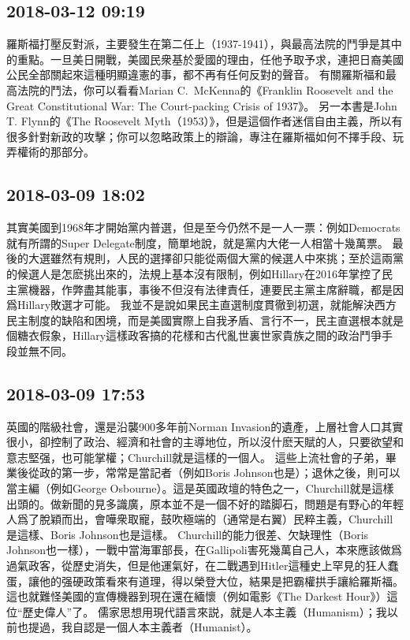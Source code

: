\documentclass[twocolumn]{ctexart}
\begin{document}
\subsection*{2018-03-12 09:19}

羅斯福打壓反對派，主要發生在第二任上（1937-1941），與最高法院的鬥爭是其中的重點。一旦美日開戰，美國民衆基於愛國的理由，任他予取予求，連把日裔美國公民全部關起來這種明顯違憲的事，都不再有任何反對的聲音。
有關羅斯福和最高法院的鬥法，你可以看看Marian C. McKenna的《Franklin Roosevelt and the Great Constitutional War: The Court-packing Crisis of 1937》。
另一本書是John T. Flynn的《The Roosevelt Myth（1953）》，但是這個作者迷信自由主義，所以有很多針對新政的攻擊；你可以忽略政策上的辯論，專注在羅斯福如何不擇手段、玩弄權術的那部分。
\subsection*{2018-03-09 18:02}

其實美國到1968年才開始黨内普選，但是至今仍然不是一人一票：例如Democrats就有所謂的Super Delegate制度，簡單地說，就是黨内大佬一人相當十幾萬票。
最後的大選雖然有規則，人民的選擇卻只能從兩個大黨的候選人中來挑；至於這兩黨的候選人是怎麽挑出來的，法規上基本沒有限制，例如Hillary在2016年掌控了民主黨機器，作弊盡其能事，事後不但沒有法律責任，連要民主黨主席辭職，都是因爲Hillary敗選才可能。
我並不是說如果民主直選制度貫徹到初選，就能解決西方民主制度的缺陷和困境，而是美國實際上自我矛盾、言行不一，民主直選根本就是個糖衣假象，Hillary這樣政客搞的花樣和古代亂世裏世家貴族之間的政治鬥爭手段並無不同。
\subsection*{2018-03-09 17:53}

英國的階級社會，還是沿襲900多年前Norman Invasion的遺產，上層社會人口其實很小，卻控制了政治、經濟和社會的主導地位，所以沒什麽天賦的人，只要欲望和意志堅强，也可能掌權；Churchill就是這樣的一個人。
這些上流社會的子弟，畢業後從政的第一步，常常是當記者（例如Boris Johnson也是）；退休之後，則可以當主編（例如George Osbourne）。這是英國政壇的特色之一，Churchill就是這樣出頭的。做新聞的見多識廣，原本並不是一個不好的踏脚石，問題是有野心的年輕人爲了脫穎而出，會嘩衆取寵，鼓吹極端的（通常是右翼）民粹主義，Churchill是這樣、Boris Johnson也是這樣。
Churchill的能力很差、欠缺理性（Boris Johnson也一樣），一戰中當海軍部長，在Gallipoli害死幾萬自己人，本來應該做爲過氣政客，從歷史消失，但是他運氣好，在二戰遇到Hitler這種史上罕見的狂人蠢蛋，讓他的强硬政策看來有道理，得以榮登大位，結果是把霸權拱手讓給羅斯福。這也就難怪美國的宣傳機器到現在還在緬懷（例如電影《The Darkest Hour》）這位“歷史偉人”了。
儒家思想用現代語言來説，就是人本主義（Humanism）；我以前也提過，我自認是一個人本主義者（Humanist）。
\end{document}
